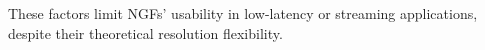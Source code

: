 \begin{table}[h]
\caption{Resolution vs. Efficiency Trade-offs in NGFs}
\centering
{}
\end{table}

These factors limit NGFs' usability in low-latency or streaming applications, despite their theoretical resolution flexibility. 
